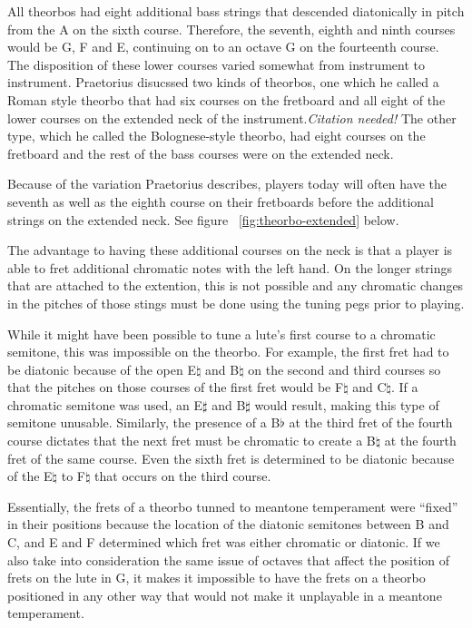 All theorbos had eight additional bass strings that descended diatonically in pitch from
the A on the sixth course.  Therefore, the seventh, eighth and ninth courses would be G, F
and E, continuing on to an octave G on the fourteenth course.  The disposition of these
lower courses varied somewhat from instrument to instrument.  Praetorius disucssed two
kinds of theorbos, one which he called a Roman style theorbo that had six courses on the
fretboard and all eight of the lower courses on the extended neck of the
instrument.\textit{Citation needed!} The other type, which he called the Bolognese-style
theorbo, had eight courses on the fretboard and the rest of the bass courses were on the
extended neck.

Because of the variation Praetorius describes, players today will often have the seventh
as well as the eighth course on their fretboards before the additional strings on the
extended neck. See figure ~\ref{fig:theorbo-extended} below.

The advantage to having these additional courses on the neck is that a
player is able to fret additional chromatic notes with the left hand.  On the longer
strings that are attached to the extention, this is not possible and any chromatic changes
in the pitches of those stings must be done using the tuning pegs prior to playing.

While it might have been possible to tune a lute's first course to a chromatic semitone,
this was impossible on the theorbo. For example, the first fret had to be diatonic because
of the open E$\natural$ and B$\natural$ on the second and third courses so that the
pitches on those courses of the first fret would be F$\natural$ and C$\natural$.  If a
chromatic semitone was used, an E$\sharp$ and B$\sharp$ would result, making this type of
semitone unusable. Similarly, the presence of a B$\flat$ at the third fret of the fourth
course dictates that the next fret must be chromatic to create a B$\natural$ at the fourth
fret of the same course. Even the sixth fret is determined to be diatonic because of the
E$\natural$ to F$\natural$ that occurs on the third course.

Essentially, the frets of a theorbo tunned to meantone temperament were ``fixed'' in their
positions because the location of the diatonic semitones between B and C, and E and F
determined which fret was either chromatic or diatonic.  If we also take into
consideration the same issue of octaves that affect the position of frets on the lute in
G, it makes it impossible to have the frets on a theorbo positioned in any other way that
would not make it unplayable in a meantone temperament.

